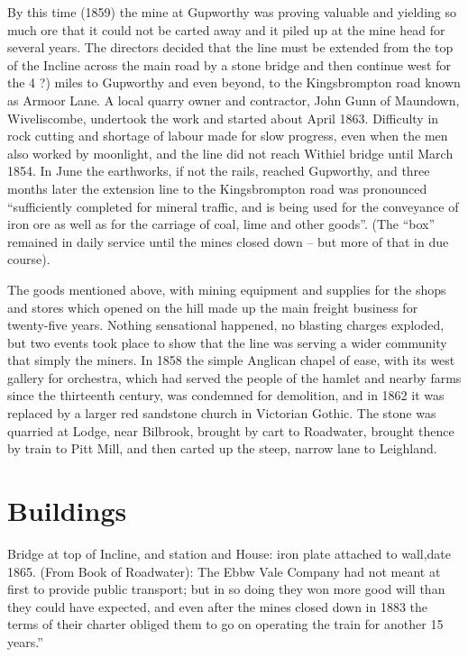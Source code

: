 \documentclass[11pt]{book}
\begin{document}
By this time (1859) the mine at Gupworthy was proving valuable and yielding so much ore that it could not be carted away and it piled up at the mine head for several years. The directors decided that the line must be extended from the top of the Incline across the main road by a stone bridge and then continue west for the 4 ?) miles to Gupworthy and even beyond, to the Kingsbrompton road known as Armoor Lane. A local quarry owner and contractor, John Gunn of Maundown, Wiveliscombe, undertook the work and started about April   1863. Difficulty in rock cutting and shortage of labour made for slow progress, even when the men also worked by moonlight, and the line did not reach Withiel bridge until March 1854. In June the earthworks, if not the rails, reached Gupworthy, and three months later the extension line to the Kingsbrompton road was pronounced “sufficiently completed for mineral traffic, and is being used for the conveyance of iron ore as well as for the carriage of coal, lime and other goods”. (The “box” remained in daily service until the mines closed down – but more of that in due course).

The goods mentioned above, with mining equipment and supplies for the shops and stores which opened on the hill made up the  main freight business for twenty-five years. Nothing sensational happened, no blasting charges exploded, but two events took place to show that the line was serving a wider community that simply the miners.  In 1858 the simple Anglican chapel of ease, with its west gallery for orchestra,  which had served the people of the hamlet and nearby farms since the thirteenth century, was condemned for demolition, and in 1862 it was  replaced by a larger red sandstone church in Victorian Gothic. The stone was quarried at Lodge, near Bilbrook, brought by cart to Roadwater, brought thence by train to Pitt Mill, and then carted up the steep, narrow lane to Leighland.

\chapter{Buildings}

Bridge at top of Incline, and station and House: iron plate attached to wall,date 1865. 
   (From Book of Roadwater): The Ebbw Vale Company had not meant at first to provide  public transport; but in so doing they won more good will than they could have expected, and even after the mines closed down in 1883 the terms of their charter obliged them to go on operating the train for another  15 years.”
\end{document}
